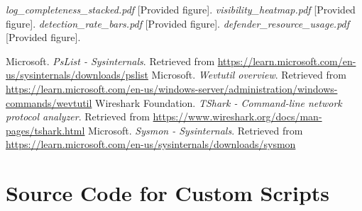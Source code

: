 \documentclass[11pt]{article}
\begin{document}
\begin{thebibliography}{99}
		 \textit{log_completeness_stacked.pdf} [Provided figure].
		 \textit{visibility_heatmap.pdf} [Provided figure].
		 \textit{detection_rate_bars.pdf} [Provided figure].
		 \textit{defender_resource_usage.pdf} [Provided figure].
		
		 Microsoft. \textit{PsList - Sysinternals}. Retrieved from \url{https://learn.microsoft.com/en-us/sysinternals/downloads/pslist}
		 Microsoft. \textit{Wevtutil overview}. Retrieved from \url{https://learn.microsoft.com/en-us/windows-server/administration/windows-commands/wevtutil}
		 Wireshark Foundation. \textit{TShark - Command-line network protocol analyzer}. Retrieved from \url{https://www.wireshark.org/docs/man-pages/tshark.html}
		 Microsoft. \textit{Sysmon - Sysinternals}. Retrieved from \url{https://learn.microsoft.com/en-us/sysinternals/downloads/sysmon}
		
	\end{thebibliography}
	\newpage
	
	\appendix
	\section{Source Code for Custom Scripts}
\end{document}
